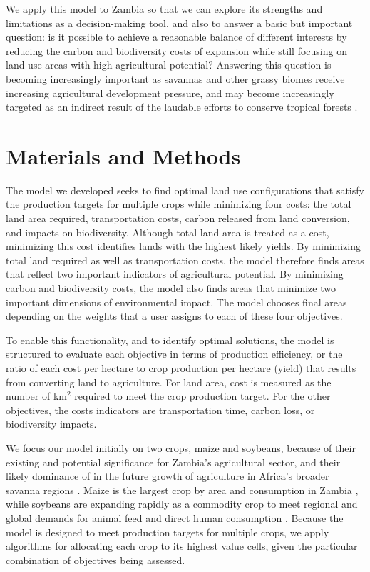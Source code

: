 \documentclass[a4paper]{article}
\begin{document}
{We apply this model to Zambia so that we can explore its strengths and limitations as a decision-making tool, and also to answer a basic but important question: is it possible to achieve a reasonable balance of different interests by reducing the carbon and biodiversity costs of expansion while still focusing on land use areas with high agricultural potential?  Answering this question is becoming increasingly important as savannas and other grassy biomes receive increasing agricultural development pressure, and may become increasingly targeted as an indirect result of the laudable efforts to conserve tropical forests \citep{searchinger_high_2015}. 

\section*{\large Materials and Methods}

The model we developed seeks to find optimal land use configurations that satisfy the production targets for multiple crops while minimizing four costs: the total land area required, transportation costs, carbon released from land conversion, and impacts on biodiversity. Although total land area is treated as a cost, minimizing this cost identifies lands with the highest likely yields. By minimizing total land required as well as transportation costs, the model therefore finds areas that reflect two important indicators of agricultural potential. By minimizing carbon and biodiversity costs, the model also finds areas that minimize two important dimensions of environmental impact.  The model chooses final areas depending on the weights that a user assigns to each of these four objectives.   

To enable this functionality, and to identify optimal solutions, the model is structured to evaluate each objective in terms of production efficiency, or the ratio of each cost per hectare to crop production per hectare (yield) that results from converting land to agriculture.  For land area, cost is measured as the number of km$^2$ required to meet the crop production target. For the other objectives, the costs indicators are transportation time, carbon loss, or biodiversity impacts.  

We focus our model initially on two crops, maize and soybeans, because of their existing and potential significance for Zambia's agricultural sector, and their likely dominance of in the future growth of agriculture in Africa's broader savanna regions \citep{searchinger_high_2015}.  Maize is the largest crop by area and consumption in Zambia \citep{fao_faostat_2016}, while soybeans are expanding rapidly as a commodity crop to meet regional and global demands for animal feed and direct human consumption \citep{gasparri_emerging_2015}. Because the model is designed to meet production targets for multiple crops, we apply algorithms for allocating each crop to its highest value cells, given the particular combination of objectives being assessed.   

}
\end{document}
